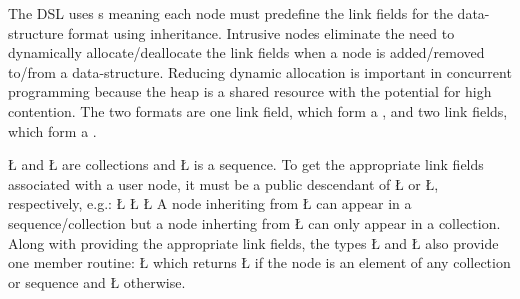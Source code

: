 \documentclass[openright,twoside]{report}
\begin{document}
The \uC DSL uses s meaning each node must predefine the link fields for the data-structure format using inheritance.
Intrusive nodes eliminate the need to dynamically allocate/deallocate the link fields when a node is added/removed to/from a data-structure.
Reducing dynamic allocation is important in concurrent programming because the heap is a shared resource with the potential for high contention.
The two formats are one link field, which form a , and two link fields, which form a .
\begin{center}

\end{center}
\LGinlinetrue\LGbegin\lgrinde\L{}\endlgrinde\LGend{} and \LGinlinetrue\LGbegin\lgrinde\L{}\endlgrinde\LGend{} are collections and \LGinlinetrue\LGbegin\lgrinde\L{}\endlgrinde\LGend{} is a sequence.
To get the appropriate link fields associated with a user node, it must be a public descendant of \LGinlinetrue\LGbegin\lgrinde\L{}\endlgrinde\LGend{} or \LGinlinetrue\LGbegin\lgrinde\L{}\endlgrinde\LGend{}, respectively, e.g.:
\LGinlinefalse\LGbegin\lgrinde
\L{}
\L{}
\L{}
\endlgrinde\LGend
A node inheriting from \LGinlinetrue\LGbegin\lgrinde\L{}\endlgrinde\LGend{} can appear in a sequence/collection but a node inherting from \LGinlinetrue\LGbegin\lgrinde\L{}\endlgrinde\LGend{} can only appear in a collection.
Along with providing the appropriate link fields, the types \LGinlinetrue\LGbegin\lgrinde\L{}\endlgrinde\LGend{} and \LGinlinetrue\LGbegin\lgrinde\L{}\endlgrinde\LGend{} also provide one member routine:
\LGinlinefalse\LGbegin\lgrinde
\L{}
\endlgrinde\LGend
{}%
%
which returns \LGinlinetrue\LGbegin\lgrinde\L{}\endlgrinde\LGend{} if the node is an element of any collection or sequence and \LGinlinetrue\LGbegin\lgrinde\L{}\endlgrinde\LGend{} otherwise.
\end{document}
